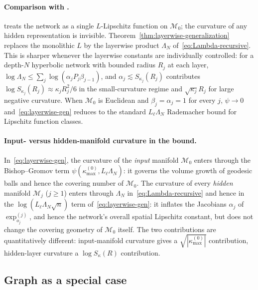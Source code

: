 \documentclass[letterpaper]{article}
\begin{document}
\paragraph{Comparison with \cite{sarkar2025learning}.}
\cite{sarkar2025learning} treats the network as a single $L$-Lipschitz
function on $\mathcal M_0$; the curvature of any hidden representation
is invisible. Theorem~\ref{thm:layerwise-generalization} replaces the
monolithic $L$ by the layerwise product
$\Lambda_N$ of~\eqref{eq:Lambda-recursive}. This is sharper whenever
the layerwise constants are individually controlled: for a depth-$N$
hyperbolic network with bounded radius $R_j$ at each layer,
$\log \Lambda_N \le \sum_j \log(\alpha_j P_j \beta_{j-1})$, and
$\alpha_j \lesssim S_{\kappa_j}(R_j)$ contributes
$\log S_{\kappa_j}(R_j) \approx \kappa_j R_j^2 / 6$ in the small-curvature
regime and $\sqrt{\kappa_j} R_j$ for large negative curvature. When
$\mathcal M_0$ is Euclidean and $\beta_j = \alpha_j = 1$ for every $j$,
\(\psi \to 0\) and~\eqref{eq:layerwise-gen} reduces to the standard
$L_\ell \Lambda_N$ Rademacher bound for Lipschitz function classes.

\paragraph{Input- versus hidden-manifold curvature in the bound.}
In~\eqref{eq:layerwise-gen}, the curvature of the \emph{input} manifold
$\mathcal M_0$ enters through the Bishop--Gromov term
$\psi(\kappa_{\max}^{(0)}, L_\ell \Lambda_N)$: it governs the volume
growth of geodesic balls and hence the covering number of $\mathcal M_0$.
The curvature of every \emph{hidden} manifold $\mathcal M_j$ ($j \ge 1$)
enters through $\Lambda_N$ in~\eqref{eq:Lambda-recursive} and hence in
the $\log(L_\ell \Lambda_N \sqrt n)$ term of~\eqref{eq:layerwise-gen}:
it inflates the Jacobians $\alpha_j$ of $\exp_{o_j}^{(j)}$, and hence the
network's overall spatial Lipschitz constant, but does not change the
covering geometry of $\mathcal M_0$ itself. The two contributions are
quantitatively different: input-manifold curvature gives a
$\sqrt{|\kappa_{\max}^{(0)}|}$ contribution, hidden-layer curvature a
$\log S_\kappa(R)$ contribution.


\subsection{Graph as a special case}
\label{sec:main-graph}
\end{document}
